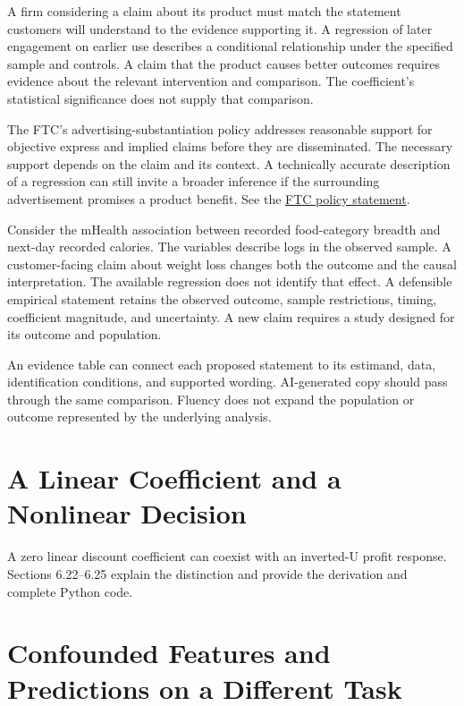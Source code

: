\noindent \noindent A firm considering a claim about its product must match the
statement customers will understand to the evidence supporting it. A
regression of later engagement on earlier use describes a conditional
relationship under the specified sample and controls. A claim that the
product causes better outcomes requires evidence about the relevant
intervention and comparison. The coefficient's statistical significance
does not supply that comparison.

The FTC's advertising-substantiation policy addresses reasonable support
for objective express and implied claims before they are disseminated.
The necessary support depends on the claim and its context. A
technically accurate description of a regression can still invite a
broader inference if the surrounding advertisement promises a product
benefit. See the
\href{https://www.ftc.gov/legal-library/browse/ftc-policy-statement-regarding-advertising-substantiation}{FTC
policy statement}.

Consider the mHealth association between recorded food-category breadth
and next-day recorded calories. The variables describe logs in the
observed sample. A customer-facing claim about weight loss changes both
the outcome and the causal interpretation. The available regression does
not identify that effect. A defensible empirical statement retains the
observed outcome, sample restrictions, timing, coefficient magnitude,
and uncertainty. A new claim requires a study designed for its outcome
and population.

An evidence table can connect each proposed statement to its estimand,
data, identification conditions, and supported wording. AI-generated
copy should pass through the same comparison. Fluency does not expand
the population or outcome represented by the underlying analysis.

\hypertarget{M03-a-linear-coefficient-and-a-nonlinear-decision}{%
\section{A Linear Coefficient and a Nonlinear
Decision}\label{M03-a-linear-coefficient-and-a-nonlinear-decision}}

\noindent \noindent A zero linear discount coefficient can coexist with an
inverted-U profit response. Sections 6.22--6.25 explain the distinction
and provide the derivation and complete Python code.

\hypertarget{M03-confounded-features-and-predictions-on-a-different-task}{%
\section{Confounded Features and Predictions on a Different
Task}\label{M03-confounded-features-and-predictions-on-a-different-task}}

